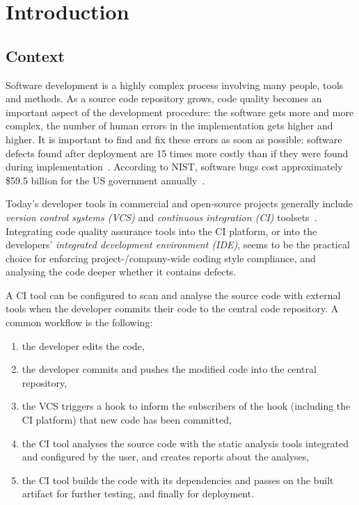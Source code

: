 \chapter{Introduction}
\label{chapter:introduction}


\section{Context}

Software development is a highly complex process involving many people, tools and methods. As a source code repository grows, code quality becomes an important aspect of the development procedure: the software gets more and more complex, the number of human errors in the implementation gets higher and higher. It is important to find and fix these errors as soon as possible: software defects found after deployment are 15 times more costly than if they were found during implementation~\cite{dawson2010integrating}. According to NIST, software bugs cost approximately \$59.5 billion for the US government annually~\cite{tassey2002economic}.

Today's developer tools in commercial and open-source projects generally include \emph{version control systems (VCS)} and \emph{continuous integration (CI)} toolsets~\cite{hilton2016usage, fowlerCI}. Integrating code quality assurance tools into the CI platform, or into the developers' \emph{integrated development environment (IDE)}, seems to be the practical choice for enforcing project-/company-wide coding style compliance, and analysing the code deeper whether it contains defects.

A CI tool can be configured to scan and analyse the source code with external tools when the developer commits their code to the central code repository. A common workflow is the following:

\begin{enumerate}
\item the developer edits the code,
\item the developer commits and pushes the modified code into the central repository,
\item the VCS triggers a hook to inform the subscribers of the hook (including the CI platform) that new code has been committed,
\item the CI tool analyses the source code with the static analysis tools integrated and configured by the user, and creates reports about the analyses,
\item the CI tool builds the code with its dependencies and passes on the built artifact for further testing, and finally for deployment.
\end{enumerate}

